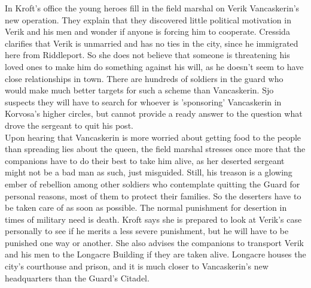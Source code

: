 In Kroft's office the young heroes fill in the field marshal on Verik Vancaskerin's new operation. They explain that they discovered little political motivation in Verik and his men and wonder if anyone is forcing him to cooperate. Cressida clarifies that Verik is unmarried and has no ties in the city, since he immigrated here from Riddleport. So she does not believe that someone is threatening his loved ones to make him do something against his will, as he doesn't seem to have close relationships in town. There are hundreds of soldiers in the guard who would make much better targets for such a scheme than Vancaskerin. Sjo suspects they will have to search for whoever is 'sponsoring' Vancaskerin in Korvosa's higher circles, but cannot provide a ready answer to the question what drove the sergeant to quit his post.\\

Upon hearing that Vancaskerin is more worried about getting food to the people than spreading lies about the queen, the field marshal stresses once more that the companions have to do their best to take him alive, as her deserted sergeant might not be a bad man as such, just misguided. Still, his treason is a glowing ember of rebellion among other soldiers who contemplate quitting the Guard for personal reasons, most of them to protect their families. So the deserters have to be taken care of as soon as possible. The normal punishment for desertion in times of military need is death. Kroft says she is prepared to look at Verik's case personally to see if he merits a less severe punishment, but he will have to be punished one way or another. She also advises the companions to transport Verik and his men to the Longacre Building if they are taken alive. Longacre houses the city's courthouse and prison, and it is much closer to Vancaskerin's new headquarters than the Guard's Citadel.\\

